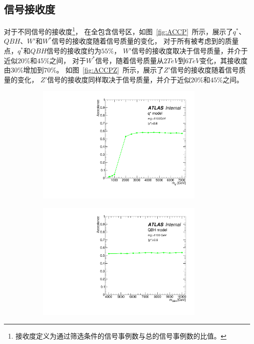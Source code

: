 \subsection{信号接收度}
\label{sec:DijetSelection3}

对于不同信号的接收度\footnote{接收度定义为通过筛选条件的信号事例数与总的信号事例数的比值。}，
在全包含信号区，如图~\ref{fig:ACCP}~所示，展示了$q^*$、$QBH$、$W'$和$W^*$信号的接收度随着信号质量的变化，
对于所有被考虑到的质量点，$q^*$和$QBH$信号的接收度约为$55\%$，
$W'$信号的接收度取决于信号质量，并介于近似$20\%$和$45\%$之间，
对于$W^*$信号，随着信号质量从$2TeV$到$6TeV$变化，其接收度由$30\%$增加到$70\%$。
如图~\ref{fig:ACCPZ}~所示，展示了$Z'$信号的接收度随着信号质量的变化，
$Z'$信号的接收度同样取决于信号质量，并介于近似$20\%$和$45\%$之间。

\begin{figure}[htbp]
  \begin{subfigure}{.5\textwidth}
  \centering
   \includegraphics[width=0.9\textwidth]{figuresDijet/03-BenchmarkSignals/Acc_Qstar.pdf}
   \caption{}
   \label{fig:QStar}
  \end{subfigure}
  \begin{subfigure}{.5\textwidth}
  \centering
   \includegraphics[width=0.9\textwidth]{figuresDijet/03-BenchmarkSignals/Acc_QBH.pdf}

\end{subfigure}
\end{figure}
